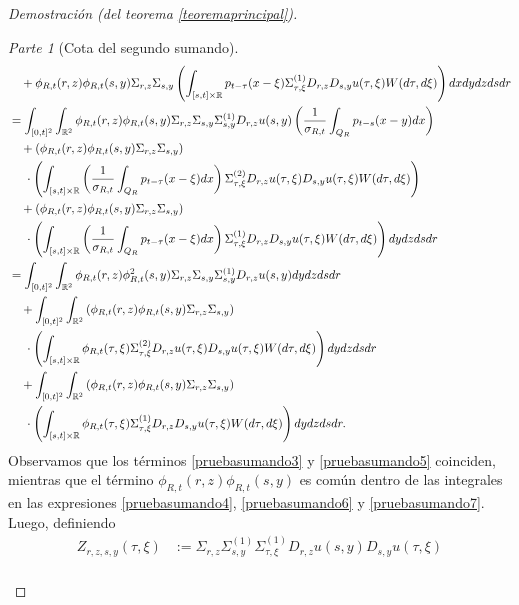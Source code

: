 \documentclass[letterpaper,twoside,12pt]{book}
\newcommand{\R}{\mathbb{R}}
\newcommand{\1}{\mathds{1}}
\theoremstyle{definition}
\theoremstyle{definition}
\theoremstyle{remark}
\newtheorem{proofpart}{Parte}
\theoremstyle{definition}
\theoremstyle{definition}
\theoremstyle{definition}
\theoremstyle{definition}
\theoremstyle{definition}
\begin{document}
\begin{proof}[Demostración (del teorema \ref{teoremaprincipal})]
\begin{proofpart}[Cota del segundo sumando]
\begin{align}
   &\ \ \ +\phi_{R,t}(r,z)\phi_{R,t}(s,y)\Sigma_{r,z}\Sigma_{s,y} \left(\int_{[s,t]\times \R}p_{t-\tau}(x-\xi)\Sigma^{(1)}_{\tau,\xi}D_{r,z}D_{s,y}u(\tau,\xi)W(d\tau,d\xi)\right) dx dy dz ds dr\notag\\
   &=\int_{[0,t]^2}\int_{\R^2}\phi_{R,t}(r,z)\phi_{R,t}(s,y)\Sigma_{r,z}\Sigma_{s,y}\Sigma^{(1)}_{s,y}D_{r,z}u(s,y)\left(\frac{1}{\sigma_{R,t}}\int_{Q_R} p_{t-s}(x-y)dx\right)\notag\\
   &\ \ \ +\left(\phi_{R,t}(r,z)\phi_{R,t}(s,y)\Sigma_{r,z}\Sigma_{s,y}\right)\notag\\
   & \ \ \ \ \cdot\left(\int_{[s,t]\times \R} \left(\frac{1}{\sigma_{R,t}}\int_{Q_R} p_{t-\tau}(x-\xi)dx\right)\Sigma^{(2)}_{\tau,\xi}D_{r,z}u(\tau,\xi)D_{s,y}u(\tau,\xi)W(d\tau,d\xi)\right)\notag\\
   &\ \ \ +\left(\phi_{R,t}(r,z)\phi_{R,t}(s,y)\Sigma_{r,z}\Sigma_{s,y}\right)\notag\\
   &\ \ \ \ \cdot \left(\int_{[s,t]\times \R}\left(\frac{1}{\sigma_{R,t}}\int_{Q_R} p_{t-\tau}(x-\xi)dx\right)\Sigma^{(1)}_{\tau,\xi}D_{r,z}D_{s,y}u(\tau,\xi)W(d\tau,d\xi)\right) dy dz ds dr\notag\\
   &=\int_{[0,t]^2}\int_{\R^2}\phi_{R,t}(r,z)\phi_{R,t}^2(s,y)\Sigma_{r,z}\Sigma_{s,y}\Sigma^{(1)}_{s,y}D_{r,z}u(s,y)dy dz ds dr\label{pruebasumando5}\\
   &\ \ \ +\int_{[0,t]^2}\int_{\R^2}\left(\phi_{R,t}(r,z)\phi_{R,t}(s,y)\Sigma_{r,z}\Sigma_{s,y}\right)\notag\\
   &\ \ \ \ \cdot\left(\int_{[s,t]\times \R} \phi_{R,t}(\tau,\xi)\Sigma^{(2)}_{\tau,\xi}D_{r,z}u(\tau,\xi)D_{s,y}u(\tau,\xi)W(d\tau,d\xi)\right) dy dz ds dr\label{pruebasumando6}\\
   &\ \ \ +\int_{[0,t]^2}\int_{\R^2}\left(\phi_{R,t}(r,z)\phi_{R,t}(s,y)\Sigma_{r,z}\Sigma_{s,y}\right)\notag\\
   &\ \ \ \ \cdot\left(\int_{[s,t]\times \R}\phi_{R,t}(\tau,\xi)\Sigma^{(1)}_{\tau,\xi}D_{r,z}D_{s,y}u(\tau,\xi)W(d\tau,d\xi)\right) dy dz ds dr.\label{pruebasumando7}
\end{align}
Observamos que los términos \eqref{pruebasumando3} y \eqref{pruebasumando5} coinciden, mientras que el término $\phi_{R,t}(r,z)\phi_{R,t}(s,y)$ es común dentro de las integrales en las expresiones \eqref{pruebasumando4}, \eqref{pruebasumando6} y \eqref{pruebasumando7}. Luego, definiendo 
\begin{align*}
   Z_{r,z,s,y}(\tau,\xi)&:=\Sigma_{r,z}\Sigma_{s,y}^{(1)}\Sigma_{\tau,\xi}^{(1)}D_{r,z}u(s,y)D_{s,y}u(\tau,\xi)\\

\end{align*}
\end{proofpart}
\end{proof}
\end{document}
